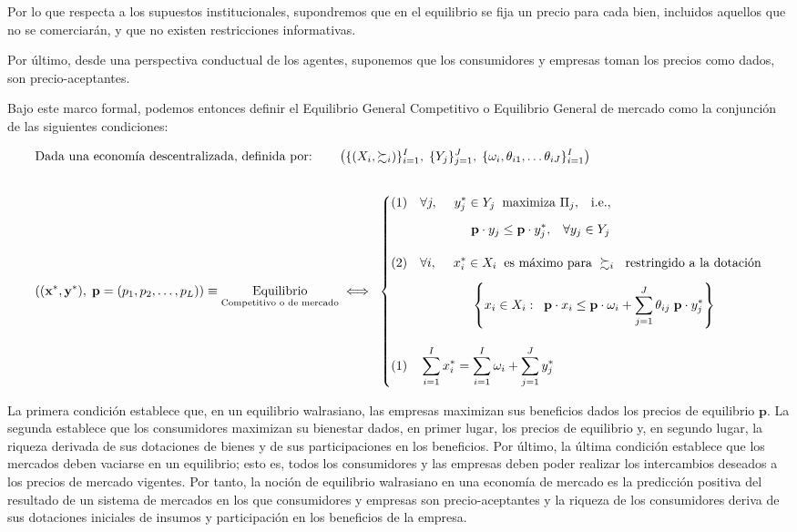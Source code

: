 \documentclass[10pt,a4paper]{article}
\begin{document}
Por lo que respecta a los supuestos institucionales, supondremos que en el equilibrio se fija un precio para cada bien, incluidos aquellos que no se comerciarán, y que no existen restricciones informativas.

Por último, desde una perspectiva conductual de los agentes, suponemos que los consumidores y empresas toman los precios como dados, son precio-aceptantes. 

Bajo este marco formal, podemos entonces definir el Equilibrio General Competitivo o Equilibrio General de mercado como la conjunción de las siguientes condiciones:

$$\begin{aligned}
    &\text{Dada una economía descentralizada, definida por:}\qquad \left(\{(X_i,\succsim_i)\}_{i=1}^I,\;\{Y_j\}_{j=1}^J,\;\{\omega_i,\theta_{i1},\dots \theta_{iJ}\}_{i=1}^I\right)\\[2em]
    &((\mathbf x^*,\mathbf y^*),\;\mathbf p=(p_1,p_2,\dots,p_L))\equiv \underset{\text{\scriptsize Competitivo o de mercado}}{\text{Equilibrio}}\iff\;
    \left\{\begin{aligned}
        &\text{(1)}&& \forall j,\quad\;y_j^*\in Y_j\;\;\text{maximiza $\Pi_j$},\;\;\;\text{i.e.},\\[0.5em]
        &&&\hspace{4em}\mathbf p\cdot y_j\leq \mathbf p\cdot y_j^*,\;\;\;\forall y_j\in Y_j\\[1em]
        &\text{(2)}&& \forall i,\quad\;x_i^*\in X_i\;\;\text{es máximo para $\;\succsim_i\;\;$ restringido a la dotación}\\[0.5em]
        &&&\hspace{4em}\left\{x_i\in X_i:\;\;\mathbf p\cdot x_i\leq \mathbf p\cdot \omega_i+\sum_{j=1}^J\theta_{ij}\;\mathbf p\cdot y_j^*\right\}\\[1em]
        &\text{(1)}&& \sum_{i=1}^Ix_i^*=\sum_{i=1}^I\omega_i+\sum_{j=1}^Jy_j^*
    \end{aligned}\right.
\end{aligned}$$


La primera condición establece que, en un equilibrio walrasiano, las empresas maximizan sus beneficios dados los precios de equilibrio $\mathbf p$. La segunda establece que los consumidores maximizan su bienestar dados, en primer lugar, los precios de equilibrio y, en segundo lugar, la riqueza derivada de sus dotaciones de bienes y de sus participaciones en los beneficios. Por último, la última condición establece que los mercados deben vaciarse en un equilibrio; esto es, todos los consumidores y las empresas deben poder realizar los intercambios deseados a los precios de mercado vigentes. Por tanto, la noción de equilibrio walrasiano en una economía de mercado es la predicción positiva del resultado de un sistema de mercados en los que consumidores y empresas son precio-aceptantes y la riqueza de los consumidores deriva de sus dotaciones iniciales de insumos y participación en los beneficios de la empresa. 
\end{document}
